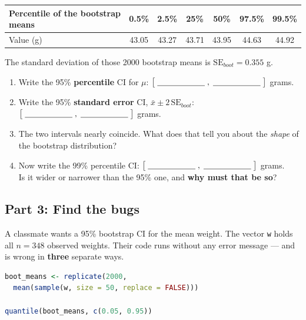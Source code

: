 \documentclass{article}
\newcommand{\blankline}[1]{\underline{\hspace{#1}}}
\begin{document}
\begin{center}
\renewcommand{\arraystretch}{1.3}
\begin{tabular}{lcccccc}
\toprule
Percentile of the bootstrap means & 0.5\% & 2.5\% & 25\% & 50\% & 97.5\% & 99.5\% \\
\midrule
Value (g) & 43.05 & 43.27 & 43.71 & 43.95 & 44.63 & 44.92 \\
\bottomrule
\end{tabular}
\end{center}

\noindent The standard deviation of those 2000 bootstrap means is $\mathrm{SE}_{boot} = 0.355$ g.

\begin{enumerate}[label={\bfseries (\Alph*)},itemsep=.8em]
\item Write the 95\% \textbf{percentile} CI for $\mu$: \quad $\big[\;\blankline{.8in}\;,\;\blankline{.8in}\;\big]$ grams.
\item Write the 95\% \textbf{standard error} CI, $\bar{x} \pm 2\,\mathrm{SE}_{boot}$: \quad $\big[\;\blankline{.8in}\;,\;\blankline{.8in}\;\big]$ grams.
\item The two intervals nearly coincide. What does that tell you about the \emph{shape} of the bootstrap distribution? \\[3.5em]
\item Now write the 99\% percentile CI: \quad $\big[\;\blankline{.8in}\;,\;\blankline{.8in}\;\big]$ grams. \\
Is it wider or narrower than the 95\% one, and \textbf{why must that be so}? \\[3.5em]
\end{enumerate}

\newpage

\subsection*{Part 3: Find the bugs}
A classmate wants a 95\% bootstrap CI for the mean weight. The vector \texttt{w} holds all $n=348$ observed weights. Their code runs without any error message --- and is wrong in \textbf{three} separate ways.

\begin{lstlisting}[language=R]
boot_means <- replicate(2000,
  mean(sample(w, size = 50, replace = FALSE)))

quantile(boot_means, c(0.05, 0.95))
\end{lstlisting}
\end{document}
